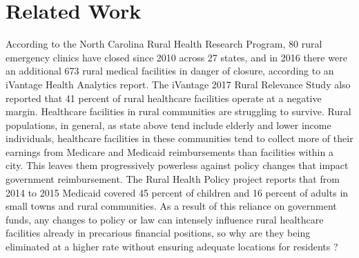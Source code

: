 \documentclass[10pt,conference]{IEEEtran}
\begin{document}
\section{Related Work}
According to the North Carolina Rural Health Research Program, 80 rural emergency clinics have closed since 2010 across 27 states, and in 2016 there were an additional 673 rural medical facilities in danger of closure, according to an iVantage Health Analytics report. The iVantage 2017 Rural Relevance Study also reported that 41 percent of rural healthcare facilities operate at a negative margin. Healthcare facilities in rural communities are struggling to survive. Rural populations, in general, as state above tend include elderly and lower income individuals, healthcare facilities in these communities tend to collect more of their earnings from Medicare and Medicaid reimbursements than facilities within a city. This leaves them progressively powerless against policy changes that impact government reimbursement. The Rural Health Policy project reports that from 2014 to 2015 Medicaid covered 45 percent of children and 16 percent of adults in small towns and rural communities. As a result of this reliance on government funds, any changes to policy or law can intensely influence rural healthcare facilities already in precarious financial positions, so why are they being eliminated at a higher rate without ensuring adequate locations for residents \cite{dellasega}?
\end{document}

